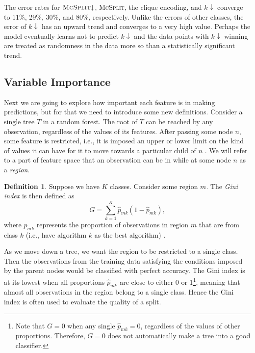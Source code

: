 \documentclass{l4proj}
\theoremstyle{definition}
\newtheorem{definition}{Definition}[chapter]
\theoremstyle{remark}
\begin{document}
The error rates for $\textsc{McSplit}{\downarrow}$, \textsc{McSplit}, the clique
encoding, and $k{\downarrow}$ converge to 11\%, 29\%, 30\%, and 80\%,
respectively. Unlike the errors of other classes, the error of $k{\downarrow}$ has
an upward trend and converges to a very high value. Perhaps the model eventually
learns not to predict $k{\downarrow}$ and the data points with $k{\downarrow}$
winning are treated as randomness in the data more so than a statistically
significant trend.

\subsection{Variable Importance}

Next we are going to explore how important each feature is in making
predictions, but for that we need to introduce some new definitions. Consider a
single tree $T$ in a random forest. The root of $T$ can be reached by any
observation, regardless of the values of its features. After passing some node
$n$, some feature is restricted, i.e., it is imposed an upper or lower limit on
the kind of values it can have for it to move towards a particular child of $n$
\cite{James:2014:ISL:2517747}. We will refer to a part of feature space that an
observation can be in while at some node $n$ as a \emph{region}.

\begin{definition}
  Suppose we have $K$ classes. Consider some region $m$. The \emph{Gini index}
  is then defined as
  \[ G = \sum_{k=1}^K \hat{p}_{mk}(1-\hat{p}_{mk}), \]
  where $\hat{p}_{mk}$ represents the proportion of observations in region $m$
  that are from class $k$ (i.e., have algorithm $k$ as the best algorithm)
  \cite{James:2014:ISL:2517747}.
\end{definition}
As we move down a tree, we want the region to be restricted to a single class.
Then the observations from the training data satisfying the conditions imposed
by the parent nodes would be classified with perfect accuracy. The Gini index is
at its lowest when all proportions $\hat{p}_{mk}$ are close to either 0 or
1\footnote{Note that $G=0$ when any single $\hat{p}_{mk}=0$, regardless of the
  values of other proportions. Therefore, $G=0$ does not automatically make a
  tree into a good classifier.}, meaning that almost all observations in the
region belong to a single class. Hence the Gini index is often used to evaluate
the quality of a split.
\end{document}
